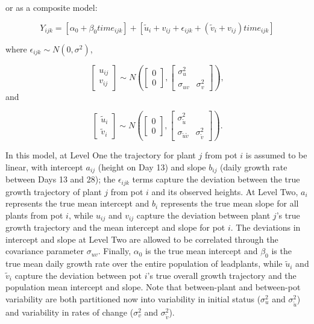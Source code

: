 \documentclass[
]{krantz}
\begin{document}
or as a composite model:

\begin{equation}
Y_{ijk}=[\alpha_{0}+\beta_{0}\textstyle{time}_{ijk}]+
[\tilde{u}_{i}+{v}_{ij}+\epsilon_{ijk}+(\tilde{v}_{i}+{v}_{ij})\textstyle{time}_{ijk}]
\label{eq:compmodb}
\end{equation}

where \(\epsilon_{ijk}\sim N(0,\sigma^2)\),

\[ \left[ \begin{array}{c}
            u_{ij} \\ v_{ij}
          \end{array}  \right] \sim N \left( \left[
          \begin{array}{c}
            0 \\ 0
          \end{array} \right], \left[
          \begin{array}{cc}
            \sigma_{u}^{2} & \\
            \sigma_{uv} & \sigma_{v}^{2}
          \end{array} \right] \right), \] and

\[ \left[ \begin{array}{c}
            \tilde{u}_{i} \\ \tilde{v}_{i}
          \end{array}  \right] \sim N \left( \left[
          \begin{array}{c}
            0 \\ 0
          \end{array} \right], \left[
          \begin{array}{cc}
            \sigma_{\tilde{u}}^{2} & \\
            \sigma_{\tilde{u}\tilde{v}} & \sigma_{\tilde{v}}^{2}
          \end{array} \right] \right). \]

In this model, at Level One the trajectory for plant \(j\) from pot \(i\) is assumed to be linear, with intercept \(a_{ij}\) (height on Day 13) and slope \(b_{ij}\) (daily growth rate between Days 13 and 28); the \(\epsilon_{ijk}\) terms capture the deviation between the true growth trajectory of plant \(j\) from pot \(i\) and its observed heights. At Level Two, \(a_{i}\) represents the true mean intercept and \(b_{i}\) represents the true mean slope for all plants from pot \(i\), while \(u_{ij}\) and \(v_{ij}\) capture the deviation between plant \(j\)'s true growth trajectory and the mean intercept and slope for pot \(i\). The deviations in intercept and slope at Level Two are allowed to be correlated through the covariance parameter \(\sigma_{uv}\). Finally, \(\alpha_{0}\) is the true mean intercept and \(\beta_{0}\) is the true mean daily growth rate over the entire population of leadplants, while \(\tilde{u}_{i}\) and \(\tilde{v}_{i}\) capture the deviation between pot \(i\)'s true overall growth trajectory and the population mean intercept and slope. Note that between-plant and between-pot variability are both partitioned now into variability in initial status (\(\sigma_{u}^{2}\) and \(\sigma_{\tilde{u}}^{2}\)) and variability in rates of change (\(\sigma_{v}^{2}\) and \(\sigma_{\tilde{v}}^{2}\)).
\end{document}
